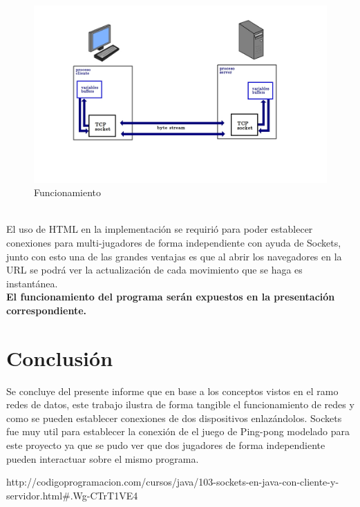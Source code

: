 \documentclass[spanish]{udpreport}
\begin{document}
\begin{figure}[h]
    \centering
    \includegraphics[scale=0.5]{images/sock.jpeg}
    \caption{Funcionamiento}
    \label{fig:my_label}
\end{figure}
\\[0.5cm] El uso de HTML en la implementación se requirió para poder establecer conexiones para multi-jugadores de forma independiente con ayuda de Sockets, junto con esto una de las grandes ventajas es que al abrir los navegadores en la URL se podrá ver la actualización de cada movimiento que se haga es instantánea. 
\\[9cm]
\textbf{El funcionamiento del programa serán expuestos en la presentación correspondiente.}
\chapter{Conclusión}
Se concluye del presente informe que en base a los conceptos vistos en el ramo redes de datos, este trabajo ilustra de forma tangible el funcionamiento de redes y como se pueden establecer conexiones de dos dispositivos enlazándolos. Sockets fue muy util para establecer la conexión de el juego de Ping-pong modelado para este proyecto ya que se pudo ver que dos jugadores de forma independiente pueden interactuar sobre el mismo programa.



\begin{thebibliography}{0}
http://codigoprogramacion.com/cursos/java/103-sockets-en-java-con-cliente-y-servidor.html#.Wg-CTrT1VE4 \\ 
\end{thebibliography}
\listoffigures
\end{document}
